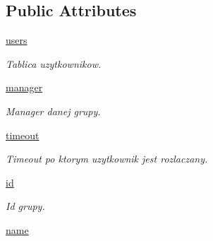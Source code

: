 \subsection*{Public Attributes}
\begin{CompactItemize}
\item 
\hypertarget{class_serv_1_1_group_1_1_group_8da1d96bcde84573f936683336b10064}{
\hyperlink{class_serv_1_1_group_1_1_group_8da1d96bcde84573f936683336b10064}{users}}
\label{class_serv_1_1_group_1_1_group_8da1d96bcde84573f936683336b10064}

\begin{CompactList}\small\item\em Tablica uzytkownikow. \item\end{CompactList}\item 
\hypertarget{class_serv_1_1_group_1_1_group_d89e6d491f6237fb219f1affca48684b}{
\hyperlink{class_serv_1_1_group_1_1_group_d89e6d491f6237fb219f1affca48684b}{manager}}
\label{class_serv_1_1_group_1_1_group_d89e6d491f6237fb219f1affca48684b}

\begin{CompactList}\small\item\em Manager danej grupy. \item\end{CompactList}\item 
\hypertarget{class_serv_1_1_group_1_1_group_87949bedd26e03b7117116b517d239de}{
\hyperlink{class_serv_1_1_group_1_1_group_87949bedd26e03b7117116b517d239de}{timeout}}
\label{class_serv_1_1_group_1_1_group_87949bedd26e03b7117116b517d239de}

\begin{CompactList}\small\item\em Timeout po ktorym uzytkownik jest rozlaczany. \item\end{CompactList}\item 
\hypertarget{class_serv_1_1_group_1_1_group_bfb82fc7970fba46ba77edf1fae41dea}{
\hyperlink{class_serv_1_1_group_1_1_group_bfb82fc7970fba46ba77edf1fae41dea}{id}}
\label{class_serv_1_1_group_1_1_group_bfb82fc7970fba46ba77edf1fae41dea}

\begin{CompactList}\small\item\em Id grupy. \item\end{CompactList}\item 
\hypertarget{class_serv_1_1_group_1_1_group_0b9cb49f5d6e2b732f8b4b4ea685999d}{
\hyperlink{class_serv_1_1_group_1_1_group_0b9cb49f5d6e2b732f8b4b4ea685999d}{name}}
\label{class_serv_1_1_group_1_1_group_0b9cb49f5d6e2b732f8b4b4ea685999d}


\end{CompactItemize}
